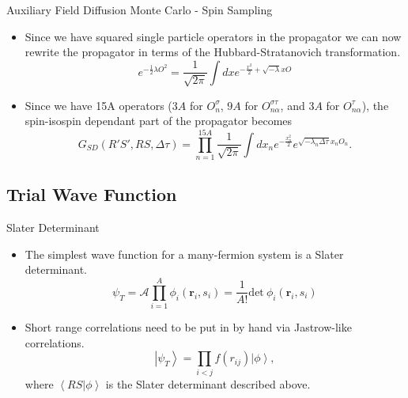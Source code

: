 \documentclass{beamer}
\newcommand{\ket}[1]{\left| #1 \right>}
\newcommand{\braket}[2]{\left< #1 | #2 \right>}
\newcommand{\dt}{\Delta\tau}
\begin{document}
\begin{frame}{Auxiliary Field Diffusion Monte Carlo - Spin Sampling}
\begin{itemize}
   \item Since we have squared single particle operators in the propagator we can now rewrite the propagator in terms of the Hubbard-Stratanovich transformation.
   \begin{equation*}
      e^{-\frac{1}{2}\lambda O^2} = \frac{1}{\sqrt{2\pi}} \int dx e^{-\frac{x^2}{2} + \sqrt{-\lambda}xO}
   \end{equation*}
   \item Since we have 15A operators ($3A$ for $O_{n}^{\sigma}$, $9A$ for $O_{n\alpha}^{\sigma\tau}$, and $3A$ for $O_{n\alpha}^{\tau}$), the spin-isospin dependant part of the propagator becomes
   \begin{equation*}
      G_{SD}(R'S',RS,\dt) = \prod\limits_{n=1}^{15A}\frac{1}{\sqrt{2\pi}}\int dx_n e^{-\frac{x_n^2}{2}}e^{\sqrt{-\lambda_n\dt} x_nO_n}.
   \end{equation*}
\end{itemize}
\end{frame}

\subsection{Trial Wave Function}
\begin{frame}{Slater Determinant}
\begin{itemize}
   \item The simplest wave function for a many-fermion system is a Slater determinant.
   \begin{equation*}
      \psi_{T} = \mathcal{A} \prod\limits_{i=1}^A \phi_i(\mathbf{r}_i,s_i) = \frac{1}{A!} \mathrm{det}~\phi_i(\mathbf{r}_i,s_i)
   \end{equation*}
   \item Short range correlations need to be put in by hand via Jastrow-like correlations.
   \begin{equation*}
      \ket{\psi_T} = \prod\limits_{i<j}f(r_{ij}) \ket{\phi},
   \end{equation*}
   where $\braket{RS}{\phi}$ is the Slater determinant described above.
\end{itemize}
\end{frame}
\end{document}
